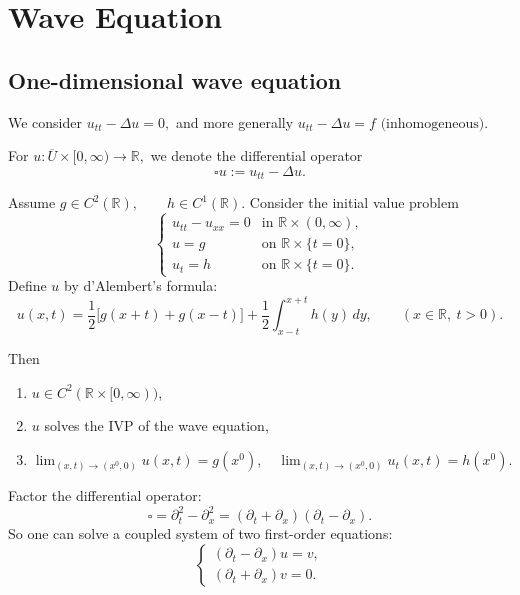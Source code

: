 \chapter{Wave Equation}


\section{One-dimensional wave equation}

We consider
$
u_{tt}-\Delta u=0,
$
and more generally
$
u_{tt}-\Delta u=f
\text{ (inhomogeneous)}.
$

\begin{definition}
For
$
u:\overline{U}\times [0,\infty)\to \mathbb{R},
$
we denote the differential operator
$$
\square u := u_{tt}-\Delta u.
$$
\end{definition}

\begin{theorem}[Solution of the wave equation when $n=1$]
Assume
$
g\in C^2(\mathbb{R}), \qquad h\in C^1(\mathbb{R}).
$
Consider the initial value problem
$$
\begin{cases}
u_{tt}-u_{xx}=0 & \text{in } \mathbb{R}\times (0,\infty),\\
u=g & \text{on } \mathbb{R}\times \{t=0\},\\
u_t=h & \text{on } \mathbb{R}\times \{t=0\}.
\end{cases}
$$
Define $u$ by d'Alembert's formula:
$$
u(x,t)
=
\frac12\bigl[g(x+t)+g(x-t)\bigr]
+
\frac12\int_{x-t}^{x+t} h(y)\,dy,
\qquad (x\in \mathbb{R},\ t>0).
$$

Then
\begin{enumerate}
    \item $u\in C^2(\mathbb{R}\times [0,\infty))$,
    \item $u$ solves the IVP of the wave equation,
    \item
    $
    \lim_{(x,t)\to (x^0,0)} u(x,t)=g(x^0),
    \quad
    \lim_{(x,t)\to (x^0,0)} u_t(x,t)=h(x^0).
    $
\end{enumerate}
\end{theorem}

\begin{remark}
Factor the differential operator:
$$
\square
=
\partial_t^2-\partial_x^2
=
(\partial_t+\partial_x)(\partial_t-\partial_x).
$$
So one can solve a coupled system of two first-order equations:
$$
\begin{cases}
(\partial_t-\partial_x)u=v,\\
(\partial_t+\partial_x)v=0.
\end{cases}
$$
\end{remark}

